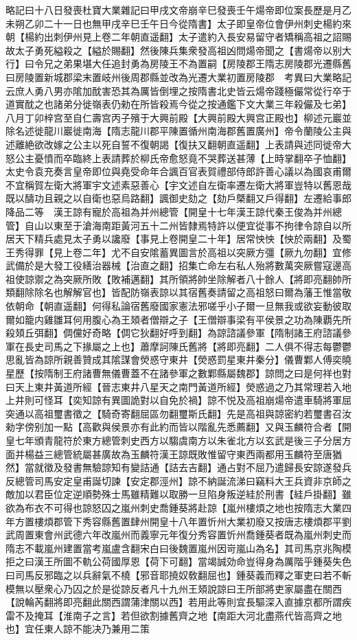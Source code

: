 略記曰十八日發喪杜寶大業雜記曰甲戌文帝崩辛巳發喪壬午煬帝即位案長歷是月乙未朔乙卯二十一日也無甲戌辛巳壬午日今從隋書】太子即皇帝位會伊州刺史楊約來朝【楊約出刺伊州見上卷二年朝直遥翻】太子遣約入長安易留守者矯稱高祖之詔賜故太子勇死縊殺之【縊於賜翻】然後陳兵集衆發高祖凶問煬帝聞之【書煬帝以别大行】曰令兄之弟果堪大任追封勇為房陵王不為置嗣【房陵郡王隋志房陵郡光遷縣舊曰房陵置新城郡梁末置岐州後周郡縣並改為光遷大業初置房陵郡　考異曰大業略記云庶人勇八男亦隂加酖害恐其為厲皆倒埋之按隋書北史皆云煬帝踐極儼常從行卒于道實酖之也諸弟分徙嶺表仍勑在所皆殺焉今從之按通鑑下文大業三年殺儼及七弟】八月丁卯梓宫至自仁壽宫丙子殯于大興前殿【大興前殿大興宫正殿也】柳述元巖並除名述徙龍川巖徙南海【隋志龍川郡平陳置循州南海郡舊置廣州】帝令蘭陵公主與述離絶欲改嫁之公主以死自誓不復朝謁【復扶又翻朝直遥翻】上表請與述同徙帝大怒公主憂憤而卒臨終上表請葬於柳氏帝愈怒竟不哭葬送甚薄【上時掌翻卒子恤翻】　太史令袁充奏言皇帝即位與堯受命年合諷百官表賀禮部侍郎許善心議以為國哀甫爾不宜稱賀左衛大將軍宇文述素惡善心【宇文述自左衛率遷左衛大將軍豈特以舊恩哉既以醻功且親之以自衛也惡烏路翻】諷御史劾之【劾戶槩翻又戶得翻】左遷給事郎降品二等　漢王諒有寵於高祖為并州總管【開皇十七年漢王諒代秦王俊為并州總管】自山以東至于滄海南距黃河五十二州皆隸焉特許以便宜從事不拘律令諒自以所居天下精兵處見太子勇以讒廢【事見上卷開皇二十年】居常怏怏【怏於兩翻】及蜀王秀得罪【見上卷二年】尤不自安隂蓄異圖言於高祖以突厥方彊【厥九勿翻】宜修武備於是大發工役繕治器械【治直之翻】招集亡命左右私人殆將數萬突厥嘗寇邊高祖使諒禦之為突厥所敗【敗補邁翻】其所領將帥坐除解者八十餘人【將即亮翻帥所類翻除除名也解解官也】皆配防嶺表諒以其宿舊奏請留之高祖怒曰爾為藩王惟當敬依朝命【朝直遥翻】何得私論宿舊廢國家憲法邪嗟乎小子爾一旦無我或欲妄動彼取爾如籠内雞雛耳何用腹心為王頍者僧辯之子【王僧辯事梁有平侯景之功為陳覇先所殺頍丘弭翻】倜儻好奇略【倜它狄翻好呼到翻】為諒諮議參軍【隋制諸王府諮議參軍在長史司馬之下掾屬之上也】蕭摩訶陳氏舊將【將即亮翻】二人俱不得志每鬱鬱思亂皆為諒所親善贊成其隂謀會熒惑守東井【熒惑罰星東井秦分】儀曹鄴人傅奕曉星歷【按隋制王府諸曹無儀曹蓋不在諸參軍之數鄴縣屬魏郡】諒問之曰是何祥也對曰天上東井黃道所經【晉志東井八星天之南門黃道所經】熒惑過之乃其常理若入地上井則可怪耳【奕知諒有異圖詭對以自免於禍】諒不悦及高祖崩煬帝遣車騎將軍屈突通以高祖璽書徵之【騎奇寄翻屈區勿翻璽斯氏翻】先是高祖與諒密約若璽書召汝勑字傍别加一點【高歡與侯景亦有此約而皆以階亂先悉薦翻】又與玉麟符合者【開皇七年頒青龍符於東方總管刺史西方以騶虞南方以朱雀北方以玄武是後三子分居方面并楊益三總管統屬甚廣故為玉麟符漢王諒既敗惟留守東西兩都用玉麟符至唐猶然】當就徵及發書無驗諒知有變詰通【詰去吉翻】通占對不屈乃遣歸長安諒遂發兵反總管司馬安定皇甫誕切諫【安定郡涇州】諒不納誕流涕曰竊料大王兵資非京師之敵加以君臣位定逆順勢殊士馬雖精難以取勝一旦陷身叛逆絓於刑書【絓戶掛翻】雖欲為布衣不可得也諒怒囚之嵐州刺史喬鍾葵將赴諒【嵐州樓煩之地也按隋志大業四年方置樓煩郡管下秀容縣舊置肆州開皇十八年置忻州大業初廢又按唐志樓煩郡平劉武周置東會州武德六年改嵐州而義寧元年復分秀容置忻州喬鍾葵者既為嵐州刺史而隋志不載嵐州建置當考嵐盧含翻宋白曰後魏置嵐州因岢嵐山為名】其司馬京兆陶模拒之曰漢王所圖不軌公荷國厚恩【荷下可翻】當竭誠効命豈得身為厲階乎鍾葵失色曰司馬反邪臨之以兵辭氣不橈【邪音耶撓奴敎翻屈也】鍾葵義而釋之軍吏曰若不斬模無以壓衆心乃囚之於是從諒反者凡十九州王頍說諒曰王所部將吏家屬盡在關西【說輪芮翻將即亮翻此關西謂蒲津關以西】若用此等則宜長驅深入直據京都所謂疾雷不及掩耳【淮南子之言】若但欲割據舊齊之地【南距大河北盡燕代皆高齊之地也】宜任東人諒不能决乃兼用二策